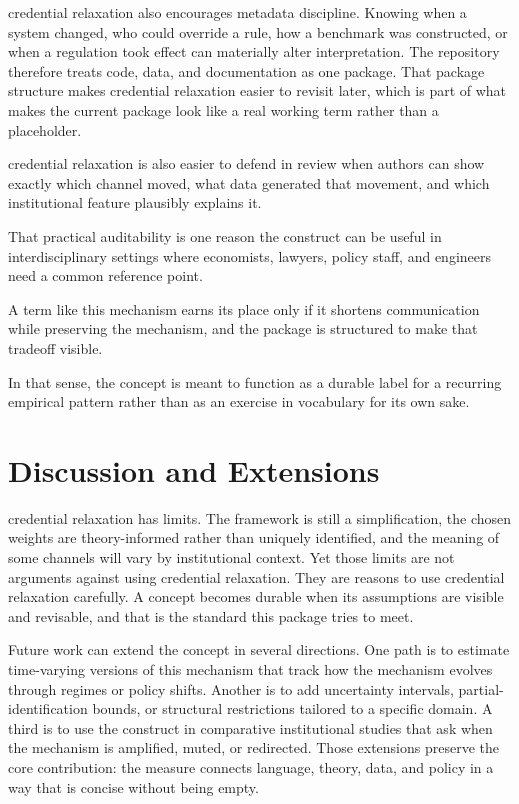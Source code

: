 \documentclass[12pt]{article}
\begin{document}
credential relaxation also encourages metadata discipline. Knowing when a system changed, who could override a rule, how a benchmark was constructed, or when a regulation took effect can materially alter interpretation. The repository therefore treats code, data, and documentation as one package. That package structure makes credential relaxation easier to revisit later, which is part of what makes the current package look like a real working term rather than a placeholder.

credential relaxation is also easier to defend in review when authors can show exactly which channel moved, what data generated that movement, and which institutional feature plausibly explains it.

That practical auditability is one reason the construct can be useful in interdisciplinary settings where economists, lawyers, policy staff, and engineers need a common reference point.

A term like this mechanism earns its place only if it shortens communication while preserving the mechanism, and the package is structured to make that tradeoff visible.

In that sense, the concept is meant to function as a durable label for a recurring empirical pattern rather than as an exercise in vocabulary for its own sake.

\section{Discussion and Extensions}
credential relaxation has limits. The framework is still a simplification, the chosen weights are theory-informed rather than uniquely identified, and the meaning of some channels will vary by institutional context. Yet those limits are not arguments against using credential relaxation. They are reasons to use credential relaxation carefully. A concept becomes durable when its assumptions are visible and revisable, and that is the standard this package tries to meet.

Future work can extend the concept in several directions. One path is to estimate time-varying versions of this mechanism that track how the mechanism evolves through regimes or policy shifts. Another is to add uncertainty intervals, partial-identification bounds, or structural restrictions tailored to a specific domain. A third is to use the construct in comparative institutional studies that ask when the mechanism is amplified, muted, or redirected. Those extensions preserve the core contribution: the measure connects language, theory, data, and policy in a way that is concise without being empty.
\end{document}
